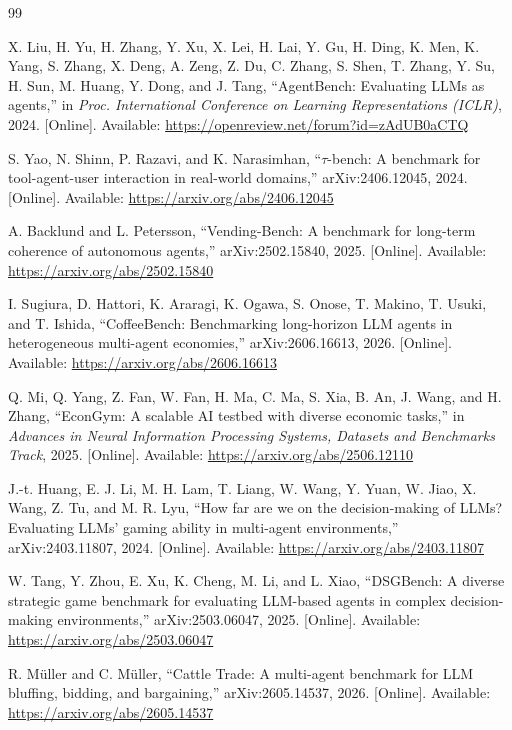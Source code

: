 \documentclass[conference]{IEEEtran}
\begin{document}
\begingroup
\raggedright
\begin{thebibliography}{99}

X. Liu, H. Yu, H. Zhang, Y. Xu, X. Lei, H. Lai, Y. Gu, H. Ding, K. Men, K. Yang, S. Zhang, X. Deng, A. Zeng, Z. Du, C. Zhang, S. Shen, T. Zhang, Y. Su, H. Sun, M. Huang, Y. Dong, and J. Tang, ``AgentBench: Evaluating LLMs as agents,'' in \emph{Proc. International Conference on Learning Representations (ICLR)}, 2024. [Online]. Available: \url{https://openreview.net/forum?id=zAdUB0aCTQ}

S. Yao, N. Shinn, P. Razavi, and K. Narasimhan, ``$\tau$-bench: A benchmark for tool-agent-user interaction in real-world domains,'' arXiv:2406.12045, 2024. [Online]. Available: \url{https://arxiv.org/abs/2406.12045}

A. Backlund and L. Petersson, ``Vending-Bench: A benchmark for long-term coherence of autonomous agents,'' arXiv:2502.15840, 2025. [Online]. Available: \url{https://arxiv.org/abs/2502.15840}

I. Sugiura, D. Hattori, K. Araragi, K. Ogawa, S. Onose, T. Makino, T. Usuki, and T. Ishida, ``CoffeeBench: Benchmarking long-horizon LLM agents in heterogeneous multi-agent economies,'' arXiv:2606.16613, 2026. [Online]. Available: \url{https://arxiv.org/abs/2606.16613}

Q. Mi, Q. Yang, Z. Fan, W. Fan, H. Ma, C. Ma, S. Xia, B. An, J. Wang, and H. Zhang, ``EconGym: A scalable AI testbed with diverse economic tasks,'' in \emph{Advances in Neural Information Processing Systems, Datasets and Benchmarks Track}, 2025. [Online]. Available: \url{https://arxiv.org/abs/2506.12110}

J.-t. Huang, E. J. Li, M. H. Lam, T. Liang, W. Wang, Y. Yuan, W. Jiao, X. Wang, Z. Tu, and M. R. Lyu, ``How far are we on the decision-making of LLMs? Evaluating LLMs' gaming ability in multi-agent environments,'' arXiv:2403.11807, 2024. [Online]. Available: \url{https://arxiv.org/abs/2403.11807}

W. Tang, Y. Zhou, E. Xu, K. Cheng, M. Li, and L. Xiao, ``DSGBench: A diverse strategic game benchmark for evaluating LLM-based agents in complex decision-making environments,'' arXiv:2503.06047, 2025. [Online]. Available: \url{https://arxiv.org/abs/2503.06047}

R. M\"uller and C. M\"uller, ``Cattle Trade: A multi-agent benchmark for LLM bluffing, bidding, and bargaining,'' arXiv:2605.14537, 2026. [Online]. Available: \url{https://arxiv.org/abs/2605.14537}


\end{thebibliography}
\end{document}
